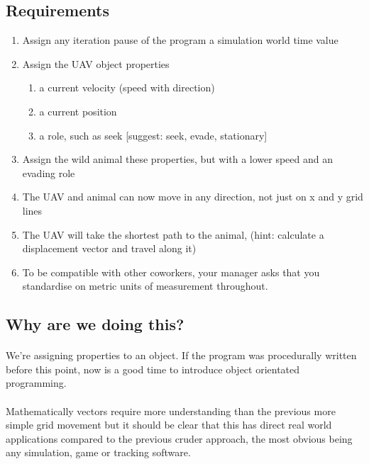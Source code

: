 \documentclass[11pt]{book}
\begin{document}
\subsection{Requirements}
\begin{enumerate}
\item Assign any iteration pause of the program a simulation world time value
\item Assign the UAV object properties
    \begin{enumerate}
    \item a current velocity (speed with direction)
    \item a current position
    \item a role, such as seek [suggest: seek, evade, stationary]
    \end{enumerate}
\item Assign the wild animal these properties, but with a lower speed and an evading role
\item The UAV and animal can now move in any direction, not just on x and y grid lines
\item The UAV will take the shortest path to the animal, (hint: calculate a displacement vector and travel along it)
\item To be compatible with other coworkers, your manager asks that you standardise on metric units of measurement throughout.
\end{enumerate}

\subsection{Why are we doing this?}

\paragraph{} We're assigning properties to an object. If the program was
procedurally written before this point, now is a good time to introduce object
orientated programming.

\paragraph{} Mathematically vectors require more understanding than the
previous more simple grid movement but it should be clear that this has direct
real world applications compared to the previous cruder approach, the most
obvious being any simulation, game or tracking software.
\end{document}
